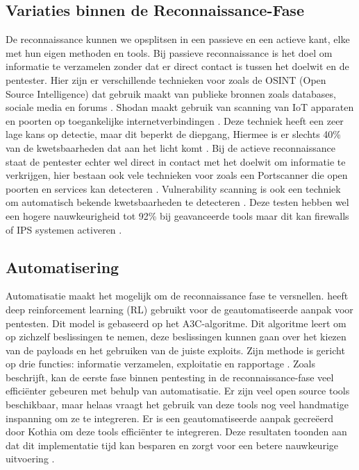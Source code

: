 \subsection{Variaties binnen de Reconnaissance-Fase}
De reconnaissance kunnen we opsplitsen in een passieve en een actieve kant, elke met hun eigen methoden en tools. 
Bij passieve reconnaissance is het doel om informatie te verzamelen zonder dat er direct contact is tussen het doelwit en de pentester.
Hier zijn er verschillende technieken voor zoals de OSINT (Open Source Intelligence) dat gebruik maakt van publieke bronnen zoals databases, sociale media en forums \autocite{Dalalana2017}. 
Shodan maakt gebruik van scanning van IoT apparaten en poorten op toegankelijke internetverbindingen \autocite{Monero2025}.
Deze techniek heeft een zeer lage kans op detectie, maar dit beperkt de diepgang, Hiermee is er slechts 40\% van de kwetsbaarheden dat aan het licht komt \parencite{Mahin2014}.
Bij de actieve reconnaissance staat de pentester echter wel direct in contact met het doelwit om informatie te verkrijgen, hier bestaan ook vele technieken voor zoals een Portscanner die open poorten en services kan detecteren \autocite{Monero2025}. 
Vulnerability scanning is ook een techniek om automatisch bekende kwetsbaarheden te detecteren \autocite{GOEL2015}. 
Deze testen hebben wel een hogere nauwkeurigheid tot 92\% bij geavanceerde tools maar dit kan firewalls of IPS systemen activeren \parencite{Li2022}.

\subsection{Automatisering}
Automatisatie maakt het mogelijk om de reconnaissance fase te versnellen. 
\textcite{Hoang} heeft deep reinforcement learning (RL) gebruikt voor de geautomatiseerde aanpak voor pentesten. 
Dit model is gebaseerd op het A3C-algoritme. Dit algoritme leert om op zichzelf beslissingen te nemen, deze beslissingen kunnen gaan over het kiezen van de payloads en het gebruiken van de juiste exploits. 
Zijn methode is gericht op drie functies: informatie verzamelen, exploitatie en rapportage \autocite{Hoang}.
Zoals \textcite{Kothia} beschrijft, kan de eerste fase binnen pentesting in de reconnaissance-fase veel efficiënter gebeuren met behulp van automatisatie. 
Er zijn veel open source tools beschikbaar, maar helaas vraagt het gebruik van deze tools nog veel handmatige inspanning om ze te integreren.
Er is een geautomatiseerde aanpak gecreëerd door Kothia om deze tools efficiënter te integreren. 
Deze resultaten toonden aan dat dit implementatie tijd kan besparen en zorgt voor een betere nauwkeurige uitvoering \parencite{Kothia}.

